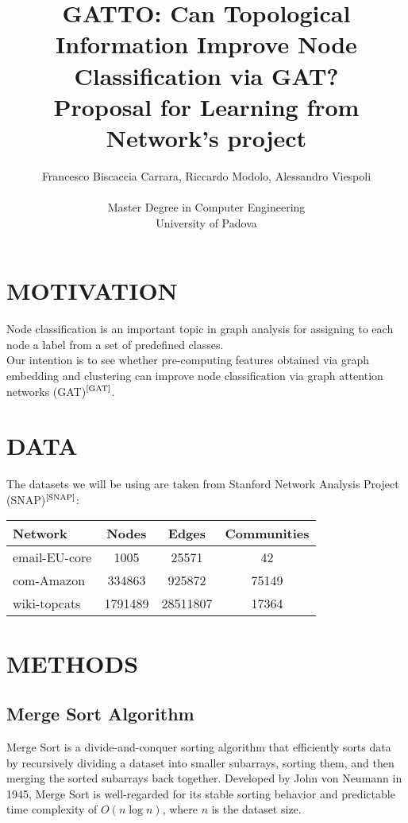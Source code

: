 \documentclass[12pt,conference]{ieeeconf} %
\title{GATTO: Can Topological Information Improve Node Classification via GAT?\\
\large Proposal for Learning from Network's project \\}
\author{Francesco Biscaccia Carrara, Riccardo Modolo, Alessandro Viespoli %
\\\\ Master Degree in Computer Engineering \\
University of Padova \\
}
\begin{document}
\maketitle
\thispagestyle{plain}
\pagestyle{plain}

\section{MOTIVATION} 
Node classification is an important topic in graph analysis for assigning to each node a label from a set of predefined classes. \\
Our intention is to see whether pre-computing features obtained via graph embedding and clustering can improve node classification via graph attention networks (GAT)$^\text{\cite{GAT}}$. 

\section{DATA}
The datasets we will be using are taken from Stanford Network Analysis Project (SNAP)$^\text{\cite{SNAP}}$: 
\begin{table}[h!]
\centering
\renewcommand{\arraystretch}{1.5}
\begin{tabular}{|l|c|c|c|}
\hline
\textbf{Network}           & \textbf{Nodes} & \textbf{Edges} & \textbf{Communities} \\
\hline
email-EU-core  & 1005           & 25571          & 42         \\
com-Amazon     & 334863         & 925872         & 75149    \\
wiki-topcats        & 1791489        & 28511807       & 17364    \\
\hline
\end{tabular}
\end{table}
\section{METHODS}

\subsection{Merge Sort Algorithm}
Merge Sort\cite{von1956new} is a divide-and-conquer sorting algorithm that efficiently sorts data by recursively dividing a dataset into smaller subarrays, sorting them, and then merging the sorted subarrays back together. Developed by John von Neumann in 1945, Merge Sort is well-regarded for its stable sorting behavior and predictable time complexity of $O(n \log n)$, where $n$ is the dataset size.
\end{document}
